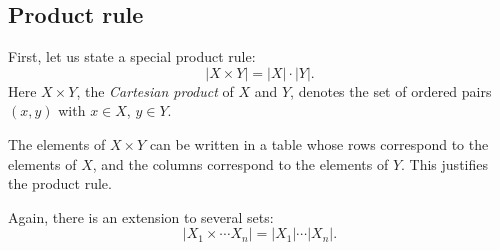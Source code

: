 \subsection{Product rule}
First, let us state a special product rule:
\[
|X \times Y| = |X| \cdot |Y|.
\]
Here $X \times Y$, the \emph{Cartesian product} of $X$ and $Y$, denotes the set of ordered pairs $(x,y)$ with $x \in X$, $y \in Y$.

The elements of $X \times Y$ can be written in a table whose rows correspond to the elements of $X$,
and the columns correspond to the elements of $Y$.
This justifies the product rule.

Again, there is an extension to several sets:
\[
|X_1 \times \cdots X_n| = |X_1| \cdots |X_n|.
\]
